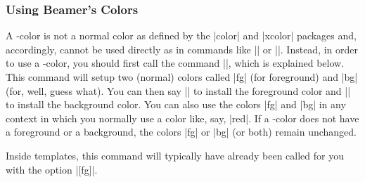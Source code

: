 \subsubsection{Using Beamer's Colors}

A \beamer-color is not a normal color as defined by the |color| and |xcolor| packages and, accordingly, cannot be used directly as in commands like |\color| or ||. Instead, in order to use a \beamer-color, you should first call the command |\usebeamercolor|, which is explained below. This command will setup two (normal) colors called |fg| (for foreground) and |bg| (for, well, guess what). You can then say |\color{fg}| to install the foreground color and |\color{bg}| to install the background color. You can also use the colors |fg| and |bg| in any context in which you normally use a color like, say, |red|. If a \beamer-color does not have a foreground or a background, the colors |fg| or |bg| (or both) remain unchanged.

Inside templates, this command will typically have already been called for you with the option |[fg]|.

